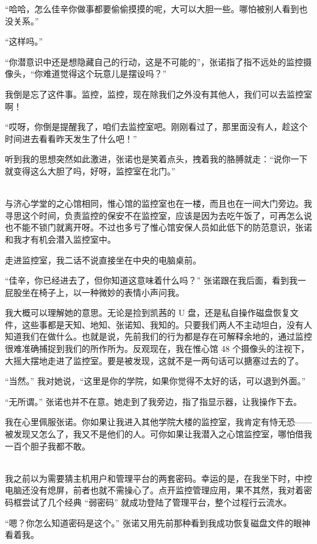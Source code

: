 \documentclass[UTF8]{ctexart}
\begin{document}
“哈哈，怎么佳辛你做事都要偷偷摸摸的呢，大可以大胆一些。哪怕被别人看到也没关系。”

“这样吗。”

“你潜意识中还是想隐藏自己的行动，这是不可能的”，张诺指了指不远处的监控摄像头，“你难道觉得这个玩意儿是摆设吗？”

我倒是忘了这件事。监控，监控，现在除我们之外没有其他人，我们可以去监控室啊！

“哎呀，你倒是提醒我了，咱们去监控室吧。刚刚看过了，那里面没有人，趁这个时间进去看看昨天发生了什么吧！”

听到我的思想突然如此激进，张诺也是笑着点头，拽着我的胳膊就走：“说你一下就变得这么大胆了吗，好呀，监控室在北门。”

~\\

与济心学堂的之心馆相同，惟心馆的监控室也在一楼，而且也在一间大门旁边。我寻思这个时间，负责监控的保安不在监控室，应该是因为去吃午饭了，可再怎么说也不能不锁门就离开呀。不过也多亏了惟心馆安保人员如此低下的防范意识，张诺和我才有机会潜入监控室中。

走进监控室，我二话不说直接坐在中央的电脑桌前。

“佳辛，你已经进去了，但你知道这意味着什么吗？” 张诺跟在我后面，看到我一屁股坐在椅子上，以一种微妙的表情小声问我。

我大概可以理解她的意思。无论是捡到凯茜的 U 盘，还是私自操作磁盘恢复文件，这些事都是天知、地知、张诺知、我知的。只要我们两人不主动坦白，没有人知道我们在做什么。也就是说，先前我们的行为都是存在可解释余地的，通过监控很难准确捕捉到我们的所作所为。反观现在，我在惟心馆 48 个摄像头的注视下，大摇大摆地走进了监控室。要是被发现，这就不是一两句话可以搪塞过去的了。

“当然。” 我对她说，“这里是你的学院，如果你觉得不太好的话，可以退到外面。”

“无所谓。” 张诺也并不在意。她走到了我旁边，指了指显示器，让我操作下去。

我在心里佩服张诺。你如果让我进入其他学院大楼的监控室，我肯定有恃无恐——被发现又怎么了，我又不是他们的人。可你如果让我潜入之心馆监控室，哪怕借我一百个胆子我都不敢。

~\\

我之前以为需要猜主机用户和管理平台的两套密码。幸运的是，在我坐下时，中控电脑还没有熄屏，前者也就不需操心了。点开监控管理应用，果不其然，我对着密码框尝试了几个经典 “弱密码” 就成功登陆了管理平台，整个过程行云流水。

“嗯？你怎么知道密码是这个。” 张诺又用先前那种看到我成功恢复磁盘文件的眼神看着我。
\end{document}
